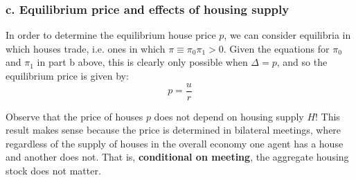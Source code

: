 \documentclass{article}
\begin{document}
\subsubsection*{c. Equilibrium price and effects of housing supply}

In order to determine the equilibrium house price $p$, we can consider
equilibria in which houses trade, i.e. ones in which $\pi\equiv\pi_{0}\pi_{1}>0$.
Given the equations for $\pi_{0}$ and $\pi_{1}$ in part b above,
this is clearly only possible when $\Delta=p$, and so the equilibrium
price is given by:
\begin{equation}
p=\frac{u}{r}
\end{equation}


Observe that the price of houses $p$ does not depend on housing supply
$H$! This result makes sense because the price is determined in bilateral
meetings, where regardless of the supply of houses in the overall
economy one agent has a house and another does not. That is, \textbf{conditional
on meeting}, the aggregate housing stock does not matter.
\end{document}
